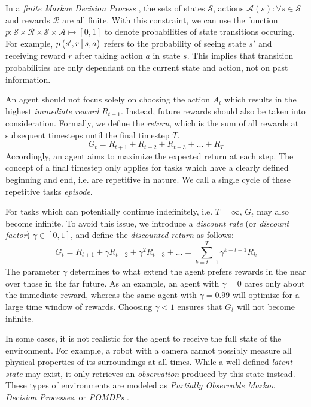 In a \textit{finite Markov Decision Process} \cite{bible}, the sets of states $\mathscr{S}$, actions $\mathscr{A}(s) : \forall s \in \mathscr{S}$ and rewards $\mathscr{R}$ are all finite. With this constraint, we can use the function $p : \mathscr{S} \times \mathscr{R} \times \mathscr{S} \times \mathscr{A} \mapsto \left[0, 1\right]$ to denote probabilities of state transitions occuring. For example, $p\left(s', r \,\middle|\, s, a\right)$ refers to the probability of seeing state $s'$ and receiving reward $r$ after taking action $a$ in state $s$. This implies that transition probabilities are only dependant on the current state and action, not on past information.

An agent should not focus solely on choosing the action $A_t$ which results in the highest \textit{immediate reward} $R_{t+1}$. Instead, future rewards should also be taken into consideration. Formally, we define the \textit{return}, which is the sum of all rewards at subsequent timesteps until the final timestep $T$.
\begin{equation*}
    G_t = R_{t+1} + R_{t+2} + R_{t+3} + ... + R_T
\end{equation*}
Accordingly, an agent aims to maximize the expected return at each step. The concept of a final timestep only applies for tasks which have a clearly defined beginning and end, i.e. are repetitive in nature. We call a single cycle of these repetitive tasks \textit{episode}.

For tasks which can potentially continue indefinitely, i.e. $T = \infty$, $G_t$ may also become infinite. To avoid this issue, we introduce a \textit{discount rate} (or \textit{discount factor}) $\gamma \in [0, 1]$, and define the \textit{discounted return} as follows:
\begin{equation*}
    G_t = R_{t+1} + \gamma R_{t+2} + \gamma^2 R_{t+3} + ...
        = \sum_{k=t+1}^T \gamma^{k-t-1} R_k
\end{equation*}
The parameter $\gamma$ determines to what extend the agent prefers rewards in the near over those in the far future. As an example, an agent with $\gamma = 0$ cares only about the immediate reward, whereas the same agent with $\gamma = 0.99$ will optimize for a large time window of rewards. Choosing $\gamma < 1$ ensures that $G_t$ will not become infinite.

In some cases, it is not realistic for the agent to receive the full state of the environment. For example, a robot with a camera cannot possibly measure all physical properties of its surroundings at all times. While a well defined \textit{latent state} may exist, it only retrieves an \textit{observation} produced by this state instead. These types of environments are modeled as \textit{Partially Observable Markov Decision Processes}, or \textit{POMDPs} \cite{bible}.